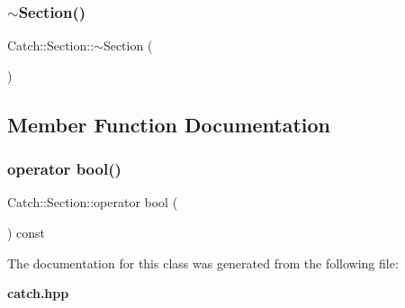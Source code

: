 \subsubsection{$\sim$\+Section()}
{\footnotesize\ttfamily Catch\+::\+Section\+::$\sim$\+Section (\begin{DoxyParamCaption}{ }\end{DoxyParamCaption})}



\subsection{Member Function Documentation}
\mbox{\label{class_catch_1_1_section_a0632b804dcea1417a2970620a9742eb3}} 
\subsubsection{operator bool()}
{\footnotesize\ttfamily Catch\+::\+Section\+::operator bool (\begin{DoxyParamCaption}{ }\end{DoxyParamCaption}) const}



The documentation for this class was generated from the following file\+:\begin{DoxyCompactItemize}
\item 
\textbf{ catch.\+hpp}\end{DoxyCompactItemize}
